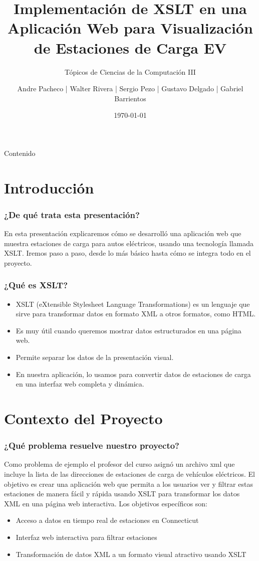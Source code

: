 \documentclass{beamer}
\title{Implementación de XSLT en una Aplicación Web para Visualización de Estaciones de Carga EV}
\subtitle{Tópicos de Ciencias de la Computación III}
\author{ Andre Pacheco | Walter Rivera | Sergio Pezo | Gustavo Delgado | Gabriel Barrientos }
\date{\today}
\institute{Universidad Nacional de Ingeniería}
\begin{document}
\begin{frame}
  \titlepage
\end{frame}

\begin{frame}{Contenido}
  \tableofcontents
\end{frame}

\section{Introducción}

  \begin{frame}
  \frametitle{¿De qué trata esta presentación?}
  En esta presentación explicaremos cómo se desarrolló una aplicación web que muestra estaciones de carga para autos eléctricos, usando una tecnología llamada XSLT. Iremos paso a paso, desde lo más básico hasta cómo se integra todo en el proyecto.
  \end{frame}

  \begin{frame}
  \frametitle{¿Qué es XSLT?}
  \begin{itemize}
      \item XSLT (eXtensible Stylesheet Language Transformations) es un lenguaje que sirve para transformar datos en formato XML a otros formatos, como HTML.
      \item Es muy útil cuando queremos mostrar datos estructurados en una página web.
      \item Permite separar los datos de la presentación visual.
      \item En nuestra aplicación, lo usamos para convertir datos de estaciones de carga en una interfaz web completa y dinámica.
  \end{itemize}
  \end{frame}

\section{Contexto del Proyecto}

  \begin{frame}
  \frametitle{¿Qué problema resuelve nuestro proyecto?}
  Como problema de ejemplo el profesor del curso asignó un archivo xml que incluye
  la lista de las direcciones de estaciones de carga de vehículos eléctricos. El objetivo es crear 
  una aplicación web que permita a los usuarios ver y filtrar estas estaciones de manera fácil y rápida
  usando XSLT para transformar los datos XML en una página web interactiva. Los objetivos específicos son:
  \begin{itemize}
      \item Acceso a datos en tiempo real de estaciones en Connecticut
      \item Interfaz web interactiva para filtrar estaciones
      \item Transformación de datos XML a un formato visual atractivo usando XSLT
  \end{itemize}
  \end{frame}
\end{document}
